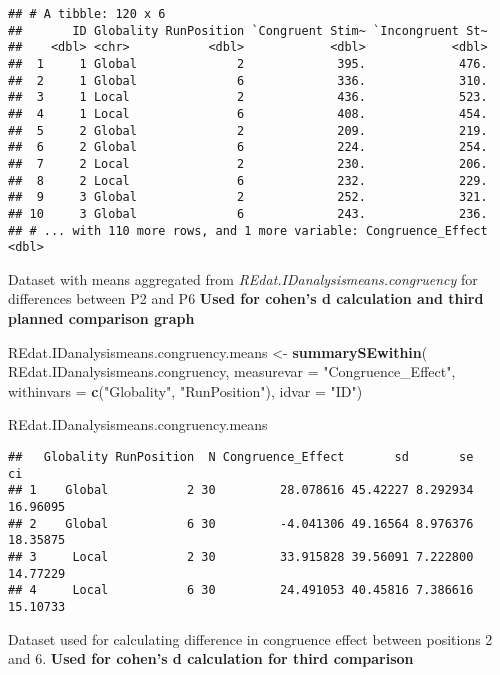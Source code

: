 \documentclass[
]{article}
\newenvironment{Shaded}{\begin{snugshade}}{\end{snugshade}}
\newcommand{\DataTypeTok}[1]{\textcolor[rgb]{0.13,0.29,0.53}{#1}}
\newcommand{\KeywordTok}[1]{\textcolor[rgb]{0.13,0.29,0.53}{\textbf{#1}}}
\newcommand{\NormalTok}[1]{#1}
\newcommand{\StringTok}[1]{\textcolor[rgb]{0.31,0.60,0.02}{#1}}
\begin{document}
\begin{verbatim}
## # A tibble: 120 x 6
##       ID Globality RunPosition `Congruent Stim~ `Incongruent St~
##    <dbl> <chr>           <dbl>            <dbl>            <dbl>
##  1     1 Global              2             395.             476.
##  2     1 Global              6             336.             310.
##  3     1 Local               2             436.             523.
##  4     1 Local               6             408.             454.
##  5     2 Global              2             209.             219.
##  6     2 Global              6             224.             254.
##  7     2 Local               2             230.             206.
##  8     2 Local               6             232.             229.
##  9     3 Global              2             252.             321.
## 10     3 Global              6             243.             236.
## # ... with 110 more rows, and 1 more variable: Congruence_Effect <dbl>
\end{verbatim}

Dataset with means aggregated from
\emph{REdat.IDanalysismeans.congruency} for differences between P2 and
P6 \textbf{Used for cohen's d calculation and third planned comparison
graph}

\begin{Shaded}
\begin{Highlighting}[]
\NormalTok{REdat.IDanalysismeans.congruency.means <-}\StringTok{ }\KeywordTok{summarySEwithin}\NormalTok{(}
\NormalTok{  REdat.IDanalysismeans.congruency,}
  \DataTypeTok{measurevar =} \StringTok{"Congruence_Effect"}\NormalTok{,}
  \DataTypeTok{withinvars =} \KeywordTok{c}\NormalTok{(}\StringTok{"Globality"}\NormalTok{, }\StringTok{"RunPosition"}\NormalTok{),}
  \DataTypeTok{idvar =} \StringTok{"ID"}\NormalTok{)}

\NormalTok{REdat.IDanalysismeans.congruency.means}
\end{Highlighting}
\end{Shaded}

\begin{verbatim}
##   Globality RunPosition  N Congruence_Effect       sd       se       ci
## 1    Global           2 30         28.078616 45.42227 8.292934 16.96095
## 2    Global           6 30         -4.041306 49.16564 8.976376 18.35875
## 3     Local           2 30         33.915828 39.56091 7.222800 14.77229
## 4     Local           6 30         24.491053 40.45816 7.386616 15.10733
\end{verbatim}

Dataset used for calculating difference in congruence effect between
positions 2 and 6. \textbf{Used for cohen's d calculation for third
comparison}
\end{document}

